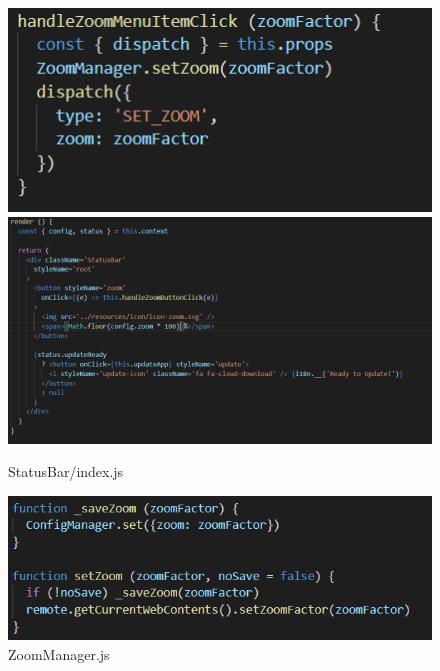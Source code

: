 \documentclass[main.tex]{subfiles}
\begin{document}
\begin{figure}[htbp]
\includegraphics[scale=0.6]{images/handlerZoom.png}
\includegraphics[scale=0.4]{images/render.png}
\centering
\caption{StatusBar/index.js}
\label{fig:statusbarindex}
\end{figure}

\begin{figure}[htbp]
\includegraphics[scale=0.7]{images/zoomManager.png}
\centering
\caption{ZoomManager.js}
\label{fig:zoommanager}
\end{figure}
\end{document}
